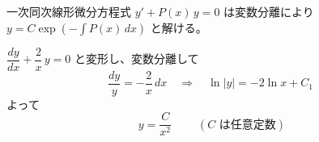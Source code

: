 
一次同次線形微分方程式 $y' + P(x)\,y = 0$ は変数分離により $y = C\exp\left(-\displaystyle\int P(x)\,dx\right)$ と解ける。

$\dfrac{dy}{dx} + \dfrac{2}{x}\,y = 0$ と変形し、変数分離して
\[
\frac{dy}{y} = -\frac{2}{x}\,dx
\quad\Longrightarrow\quad
\ln|y| = -2\ln x + C_{1}
\]
よって
\[
\boxed{\; y = \frac{C}{x^{2}} \;}
\qquad (C \text{ は任意定数})
\]
